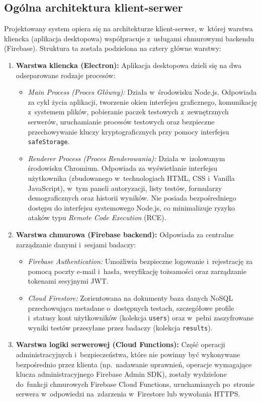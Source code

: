 \documentclass[12pt, a4paper, oneside]{report}
\begin{document}
\subsection{Ogólna architektura klient-serwer}
\label{subsec:arch-ogolna}

Projektowany system opiera się na architekturze klient-serwer, w~której warstwa kliencka (aplikacja desktopowa) współpracuje z~usługami chmurowymi backendu (Firebase). Struktura ta została podzielona na cztery główne warstwy:
\begin{enumerate}
	\item \textbf{Warstwa kliencka (Electron):} Aplikacja desktopowa dzieli się na dwa odseparowane rodzaje procesów:
	      \begin{itemize}
		      \item \textit{Main Process (Proces Główny):} Działa w~środowisku Node.js. Odpowiada za cykl życia aplikacji, tworzenie okien interfejsu graficznego, komunikację z~systemem plików, pobieranie paczek testowych z~zewnętrznych serwerów, uruchamianie procesów testowych oraz bezpieczne przechowywanie kluczy kryptograficznych przy pomocy interfejsu \texttt{safeStorage}.
		      \item \textit{Renderer Process (Proces Renderowania):} Działa w~izolowanym środowisku Chromium. Odpowiada za wyświetlanie interfejsu użytkownika (zbudowanego w~technologiach HTML, CSS i~Vanilla JavaScript), w~tym paneli autoryzacji, listy testów, formularzy demograficznych oraz historii wyników. Nie posiada bezpośredniego dostępu do interfejsu systemowego Node.js, co minimalizuje ryzyko ataków typu \textit{Remote Code Execution} (RCE).
	      \end{itemize}
	\item \textbf{Warstwa chmurowa (Firebase backend):} Odpowiada za centralne zarządzanie danymi i~sesjami badaczy:
	      \begin{itemize}
		      \item \textit{Firebase Authentication:} Umożliwia bezpieczne logowanie i~rejestrację za pomocą poczty e-mail i~hasła, weryfikację tożsamości oraz zarządzanie tokenami sesyjnymi JWT.
		      \item \textit{Cloud Firestore:} Zorientowana na dokumenty baza danych NoSQL przechowująca metadane o~dostępnych testach, szczegółowe profile i~statusy kont użytkowników (kolekcja \texttt{users}) oraz w~pełni zaszyfrowane wyniki testów przesyłane przez badaczy (kolekcja \texttt{results}).
	      \end{itemize}
	\item \textbf{Warstwa logiki serwerowej (Cloud Functions):} Część operacji administracyjnych i~bezpieczeństwa, które nie powinny być wykonywane bezpośrednio przez klienta (np.~nadawanie uprawnień, operacje wymagające klucza administracyjnego Firebase Admin SDK), zostały wydzielone do~funkcji chmurowych Firebase Cloud Functions, uruchamianych po~stronie serwera w~odpowiedzi na~zdarzenia w~Firestore lub wywołania HTTPS.

\end{enumerate}
\end{document}
